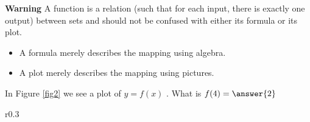 \documentclass{ximera}
\theoremstyle{definition}
\begin{document}
\textbf{Warning} A function is a relation (such that for each input, there is exactly one output) between sets and should not be confused with either its formula or its plot.
\begin{itemize}
	\item A formula merely describes the mapping using algebra.
	\item A plot merely describes the mapping using pictures.
\end{itemize}
\begin{exercise}\label{exercise1}  
In Figure \ref{fig2} we see a plot of \(y = f ( x )\) . What is \(f(4) = \answer{2}\)  
\end{exercise}
\begin{wrapfigure}{r}{0.3\textwidth}
	\centering
		\caption{}
		\label{fig2}
\end{wrapfigure}
\end{document}
